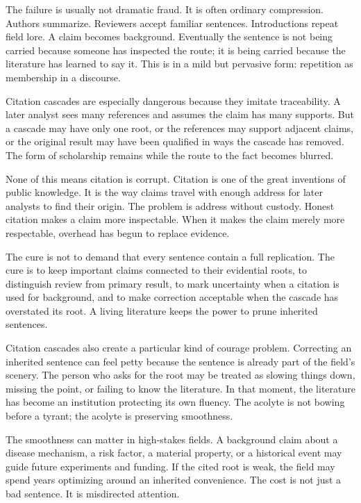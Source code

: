 The failure is usually not dramatic fraud. It is often ordinary compression.
Authors summarize. Reviewers accept familiar sentences. Introductions repeat
field lore. A claim becomes background. Eventually the sentence is not being
carried because someone has inspected the route; it is being carried because
the literature has learned to say it. This is  in a mild but
pervasive form: repetition as membership in a discourse.

Citation cascades are especially dangerous because they imitate traceability.
A later analyst sees many references and assumes the claim has many supports. But a
cascade may have only one root, or the references may support adjacent claims,
or the original result may have been qualified in ways the cascade has
removed. The form of scholarship remains while the route to the fact becomes
blurred.

None of this means citation is corrupt. Citation is one of the great
inventions of public knowledge. It is the way claims travel with enough
address for later analysts to find their origin. The problem is address
without custody. Honest citation makes a claim more inspectable. When it
makes the claim merely more respectable, overhead has begun to replace
evidence.

The cure is not to demand that every sentence contain a full replication. The
cure is to keep important claims connected to their evidential roots, to
distinguish review from primary result, to mark uncertainty when a citation is
used for background, and to make correction acceptable when the cascade has
overstated its root. A living literature keeps the power to prune inherited
sentences.

Citation cascades also create a particular kind of courage problem. Correcting
an inherited sentence can feel petty because the sentence is already part of
the field's scenery. The person who asks for the root may be treated as
slowing things down, missing the point, or failing to know the literature. In
that moment, the literature has become an institution protecting its own
fluency. The acolyte is not bowing before a tyrant; the acolyte is preserving
smoothness.

The smoothness can matter in high-stakes fields. A background claim about a
disease mechanism, a risk factor, a material property, or a historical event
may guide future experiments and funding. If the cited root is weak, the
field may spend years optimizing around an inherited convenience. The cost is
not just a bad sentence. It is misdirected attention.

